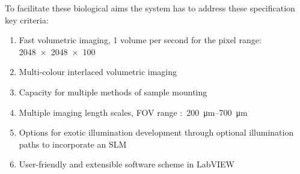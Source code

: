 To facilitate these biological aims the system has to address these specification key criteria:

\begin{enumerate}
    \item Fast volumetric imaging, 1 volume per second for the pixel range:\\\SI{2048x2048x100}{}\label{item:volumes}
    \item Multi-colour interlaced volumetric imaging  \label{item:colour}
    \item Capacity for multiple methods of sample mounting \label{item:mounting}
    \item Multiple imaging length scales, \gls{FOV} range :~\SIrange{200}{700}{\micro\meter} \label{item:scales}%
    \item Options for exotic illumination development through optional illumination paths to incorporate an \gls{SLM} \label{item:illumination}
    \item User-friendly and extensible software scheme in \gls{LabVIEW} \label{item:software}
\end{enumerate}

%
%
%
%
%

